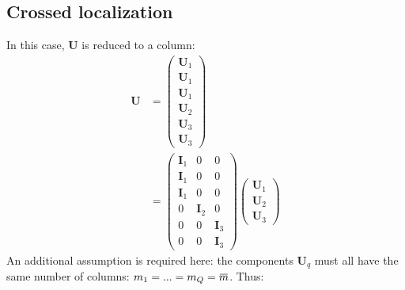 \documentclass[12pt]{scrartcl}
\newcommand{\overbar}[1]{\mkern 1.5mu\overline{\mkern-1.5mu#1\mkern-1.5mu}\mkern 1.5mu}
\begin{document}
\subsection{Crossed localization}
In this case, $\mathbf{U}$ is reduced to a column:
\begin{align}
\mathbf{U} & = \left( \begin{array}{c}
\mathbf{U}_1 \\
\mathbf{U}_1 \\
\mathbf{U}_1 \\[0.3ex]
\hline
\mathbf{U}_2 \\[0.3ex]
\hline
\mathbf{U}_3 \\
\mathbf{U}_3
\end{array} \right) \nonumber \\
& = \left( \begin{array}{c|c|c}
\mathbf{I}_1 & 0 & 0 \\
\mathbf{I}_1 & 0 & 0 \\
\mathbf{I}_1 & 0 & 0 \\[0.3ex]
\hline
0 & \mathbf{I}_2 & 0 \\[0.3ex]
\hline
0 & 0 & \mathbf{I}_3 \\
0 & 0 & \mathbf{I}_3
\end{array} \right)
\left( \begin{array}{c}
\mathbf{U}_1 \\[0.3ex]
\hline
\mathbf{U}_2 \\[0.3ex]
\hline
\mathbf{U}_3
\end{array} \right)
\end{align}
An additional assumption is required here: the components $\mathbf{U}_q$ must all have the same number of columns: $m_1 = ... = m_Q = \overbar{m}$. Thus:
\end{document}
